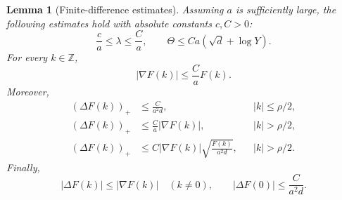 \documentclass[10pt,a4paper]{amsart}
\newtheorem{lemma}{Lemma}
\newcommand*{\ZZ}{\mathbb Z}
\begin{document}
\begin{lemma}[Finite-difference estimates]\label{lem:potential}
Assuming $a$ is sufficiently large, the following estimates hold with
absolute constants $c,C>0$:
\begin{equation}\label{eq:lambda-theta-bounds}
    \frac{c}{a}\le\lambda\le\frac{C}{a},
    \qquad
    \Theta\le Ca(\sqrt d+\log Y).
\end{equation}
For every $k\in\ZZ$,
\begin{equation}\label{eq:first-difference-bound}
    |\nabla F(k)|\le\frac{C}{a}F(k).
\end{equation}
Moreover,
\begin{align}
 (\Delta F(k))_+&\le\frac{C}{a^2d},
       && |k|\le\rho/2,\label{eq:second-difference-small}\\
 (\Delta F(k))_+&\le\frac{C}{a}|\nabla F(k)|,
       && |k|>\rho/2,\label{eq:second-difference-large-1}\\
 (\Delta F(k))_+&\le
       C|\nabla F(k)|\sqrt{\frac{F(k)}{a^2d}},
       && |k|>\rho/2.\label{eq:second-difference-large-2}
\end{align}
Finally,
\begin{equation}\label{eq:second-by-first}
 |\Delta F(k)|\le|\nabla F(k)|\quad(k\ne0),
 \qquad
 |\Delta F(0)|\le\frac{C}{a^2d}.
\end{equation}
\end{lemma}
\end{document}
